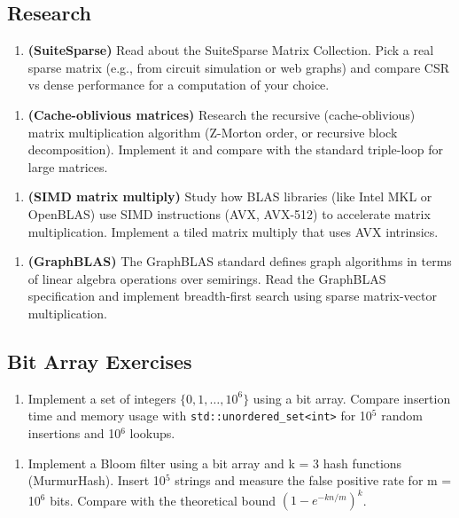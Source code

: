 \subsection{Research}

\begin{enumerate}
\item \textbf{(SuiteSparse)} Read about the SuiteSparse Matrix Collection. Pick a real sparse matrix (e.g., from circuit simulation or web graphs) and compare CSR vs dense performance for a computation of your choice.
\end{enumerate}

\begin{enumerate}
\item \textbf{(Cache-oblivious matrices)} Research the recursive (cache-oblivious) matrix multiplication algorithm (Z-Morton order, or recursive block decomposition). Implement it and compare with the standard triple-loop for large matrices.
\end{enumerate}

\begin{enumerate}
\item \textbf{(SIMD matrix multiply)} Study how BLAS libraries (like Intel MKL or OpenBLAS) use SIMD instructions (AVX, AVX-512) to accelerate matrix multiplication. Implement a tiled matrix multiply that uses AVX intrinsics.
\end{enumerate}

\begin{enumerate}
\item \textbf{(GraphBLAS)} The GraphBLAS standard defines graph algorithms in terms of linear algebra operations over semirings. Read the GraphBLAS specification and implement breadth-first search using sparse matrix-vector multiplication.
\end{enumerate}

\subsection{Bit Array Exercises}

\begin{enumerate}
\item Implement a set of integers $\{0, 1, \ldots, 10^{6}\}$ using a bit array. Compare insertion time and memory usage with \texttt{std::unordered\_set<int>} for 10$^{5}$ random insertions and 10$^{6}$ lookups.
\end{enumerate}

\begin{enumerate}
\item Implement a Bloom filter using a bit array and k = 3 hash functions (MurmurHash). Insert 10$^{5}$ strings and measure the false positive rate for m = 10$^{6}$ bits. Compare with the theoretical bound $(1 - e^{-kn/m})^k$.
\end{enumerate}

